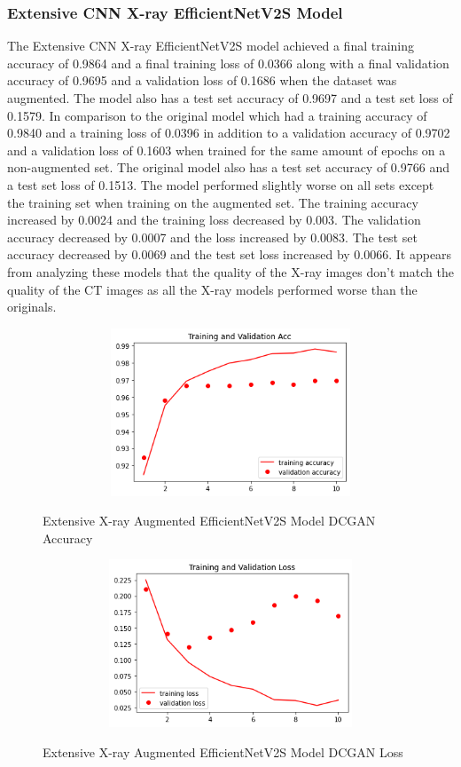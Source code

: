 \subsubsection{Extensive CNN X-ray EfficientNetV2S Model}
The Extensive CNN X-ray EfficientNetV2S model achieved a final training accuracy of 0.9864 and a final training loss of 0.0366 along with a final validation accuracy of 0.9695 and a validation loss of 0.1686 when the dataset was augmented.  The model also has a test set accuracy of 0.9697 and a test set loss of 0.1579.  In comparison to the original model which had a training accuracy of 0.9840 and a training loss of 0.0396 in addition to a validation accuracy of 0.9702 and a validation loss of 0.1603 when trained for the same amount of epochs on a non-augmented set.  The original model also has a test set accuracy of 0.9766 and a test set loss of 0.1513.  The model performed slightly worse on all sets except the training set when training on the augmented set.  The training accuracy increased by 0.0024 and the training loss decreased by 0.003. The validation accuracy decreased by 0.0007 and the loss increased by 0.0083.  The test set accuracy decreased by 0.0069 and the test set loss increased by 0.0066.  It appears from analyzing these models that the quality of the X-ray images don't match the quality of the CT images as all the X-ray models performed worse than the originals.
 \begin{figure}[H]
    \centering    \includegraphics[width=1\textwidth,height=5cm,keepaspectratio]{Images/EfficientNetV2SBaselineTrainingValidationAccuracyExtensiveXRayAugmentedDCGAN.png}\\
    \caption{Extensive X-ray Augmented EfficientNetV2S Model DCGAN Accuracy}
    \label{fig:Extensive X-ray Augmented EfficientNetV2S Model DCGAN Accuracy}
\end{figure}
 \begin{figure}[H]
    \centering
    \includegraphics[width=1\textwidth,height=5cm,keepaspectratio]{Images/EfficientNetV2SBaselineTrainingValidationLossExtensiveXRayAugmentedDCGAN.png}\\
    \caption{Extensive X-ray Augmented EfficientNetV2S Model DCGAN Loss}
    \label{fig:Extensive X-ray Augmented EfficientNetV2S Model DCGAN Loss}
\end{figure}
